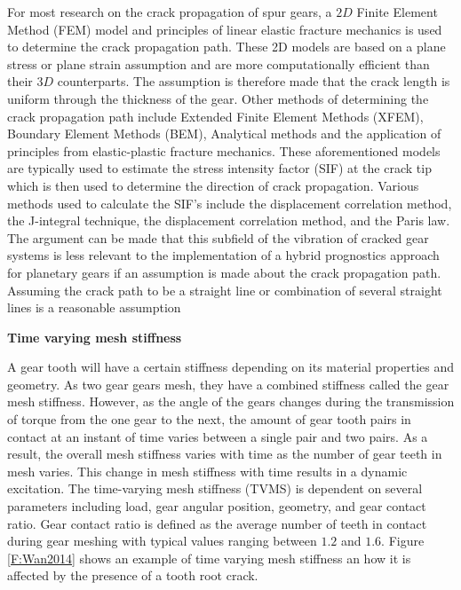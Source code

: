 For most research on the crack propagation of spur gears, a $2D$ Finite Element Method (FEM) model and principles of linear elastic fracture mechanics is used to determine the crack propagation path. These 2D models are based on a plane stress or plane strain assumption and are more computationally efficient than their $3D$ counterparts. The assumption is therefore made that the crack length is uniform through the thickness of the gear. Other methods of determining the crack propagation path include Extended Finite Element Methods (XFEM), Boundary Element Methods (BEM), Analytical methods and the application of principles from elastic-plastic fracture mechanics. These aforementioned models are typically used to estimate the stress intensity factor (SIF) at the crack tip which is then used to determine the direction of crack propagation. Various methods used to calculate the SIF's include the displacement correlation method, the J-integral technique, the displacement correlation method, and the Paris law\cite{Ma2015}. The argument can be made that this subfield of the vibration of cracked gear systems is less relevant to the implementation of a hybrid prognostics approach for planetary gears if an assumption is made about the crack propagation path. Assuming the crack path to be a straight line or combination of several straight lines is a reasonable assumption \citep{Cheng2012,Zhao2013,Pandya2013}






\textbf{Time varying mesh stiffness}

A gear tooth will have a certain stiffness depending on its material properties and geometry. As two gear gears mesh, they have a combined stiffness called the gear mesh stiffness. However, as the angle of the gears changes during the transmission of torque from the one gear to the next, the amount of gear tooth pairs in contact at an instant of time varies between a single pair and two pairs. As a result, the overall mesh stiffness varies with time as the number of gear teeth in mesh varies. This change in mesh stiffness with time results in a dynamic excitation. The time-varying mesh stiffness (TVMS) is dependent on several parameters including load, gear angular position, geometry, and gear contact ratio. Gear contact ratio is defined as the average number of teeth in contact during gear meshing with typical values ranging between $1.2$ and $1.6$. Figure \ref{F:Wan2014} shows an example of time varying mesh stiffness an how it is affected by the presence of a tooth root crack.


